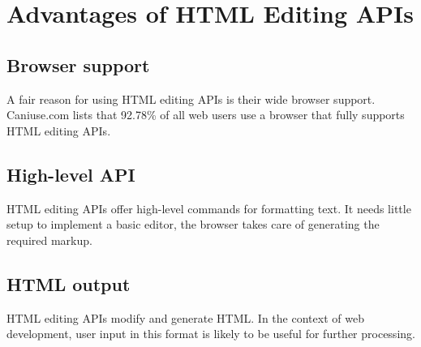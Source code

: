 
\section{Advantages of HTML Editing APIs}
\label{sec:edit_api_adv}


\subsection{Browser support}

A fair reason for using HTML editing APIs is their wide browser support. Caniuse.com lists that 92.78\% of all web users use a browser that fully supports HTML editing APIs\cite{caniuse_contenteditable}.



\subsection{High-level API}

HTML editing APIs offer high-level commands for formatting text. It needs little setup to implement a basic editor, the browser takes care of generating the required markup.

\subsection{HTML output}

HTML editing APIs modify and generate HTML. In the context of web development, user input in this format is likely to be useful for further processing.



